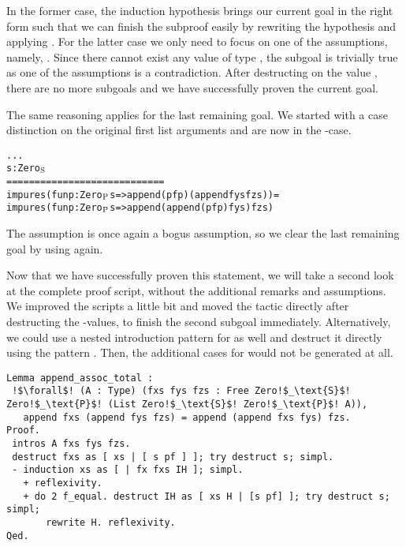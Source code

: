 In the former case, the induction hypothesis brings our current goal in the right form such that we can finish the subproof easily by rewriting the hypothesis  and applying .
For the latter case we only need to focus on one of the assumptions, namely, .
Since there cannot exist any value of type , the subgoal is trivially true as one of the assumptions is a contradiction.
After destructing on the value , there are no more subgoals and we have successfully proven the current goal.

The same reasoning applies for the last remaining goal.
We started with a case distinction on the original first list arguments  and are now in the \--case.

\begin{alltt}
  ...
  s : Zero\(\sb{\text{S}}\)
  ============================
  impure s (fun p : Zero\(\sb{\text{P}}\) s => append (pf p) (append fys fzs)) =
  impure s (fun p : Zero\(\sb{\text{P}}\) s => append (append (pf p) fys) fzs)
\end{alltt}

The assumption  is once again a bogus assumption, so we clear the last remaining goal by using  again.

Now that we have successfully proven this statement, we will take a second look at the complete proof script, without the additional remarks and assumptions.
We improved the scripts a little bit and moved the  tactic directly after destructing the \--values, to finish the second subgoal immediately.
Alternatively, we could use a nested introduction pattern for  as well and destruct it directly using the pattern \cinl{[]}.
Then, the additional cases for  would not be generated at all.

\begin{verbatim}
Lemma append_assoc_total :
 !$\forall$! (A : Type) (fxs fys fzs : Free Zero!$_\text{S}$! Zero!$_\text{P}$! (List Zero!$_\text{S}$! Zero!$_\text{P}$! A)),
   append fxs (append fys fzs) = append (append fxs fys) fzs.
Proof.
 intros A fxs fys fzs.
 destruct fxs as [ xs | [ s pf ] ]; try destruct s; simpl.
 - induction xs as [ | fx fxs IH ]; simpl.
   + reflexivity.
   + do 2 f_equal. destruct IH as [ xs H | [s pf] ]; try destruct s; simpl;
       rewrite H. reflexivity.
Qed.
\end{verbatim}

